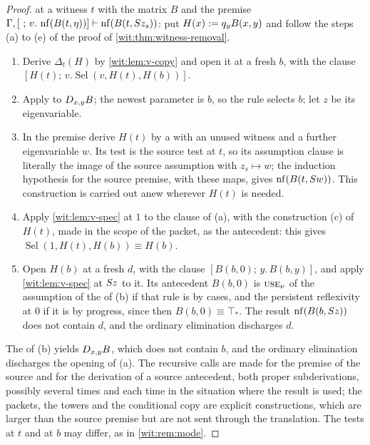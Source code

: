 \begin{proof}
 at a witness $t$ with the matrix $B$ and the premise
$\Gamma,[\ ;\,v.\,\nf(B(t,\eta))]\proves\nf(B(t,\Suc z_s))$: put
$H(x)\mathrel{:=} q_yB(x,y)$ and follow the steps (a) to (e) of the proof of
\cref{wit:thm:witness-removal}.
\begin{enumerate}[label=\textup{(\alph*)}]
\item Derive $\Delta_t(H)$ by \cref{wit:lem:v-copy} and open it at a fresh
 $b$, with the clause $[H(t);\,v.\operatorname{Sel}(v,H(t),H(b))]$.
\item Apply  to $D_{x,y}B$; the newest parameter is $b$, so
 the rule selects $b$; let $z$ be its eigenvariable.
\item In the premise derive $H(t)$ by a  with an unused
 witness and a further eigenvariable $w$.  Its test is the source test at
 $t$, so its assumption clause is literally the image of the source
 assumption with $z_s\mapsto w$; the induction hypothesis for the source
 premise, with these maps, gives $\operatorname{nf}(B(t,S w))$.  This construction is
 carried out anew wherever $H(t)$ is needed.
\item Apply \cref{wit:lem:v-spec} at $1$ to the clause of (a), with the
 construction (c) of $H(t)$, made in the scope of the packet, as the
 antecedent: this gives $\operatorname{Sel}(1,H(t),H(b))\equiv H(b)$.
\item Open $H(b)$ at a fresh $d$, with the clause $[B(b,0);\,y.\,B(b,y)]$,
 and apply \cref{wit:lem:v-spec} at $S z$ to it.  Its antecedent
 $B(b,0)$ is $\rulename{Use}_\nu$ of the assumption of the 
 of (b) if that rule is by cases, and the persistent reflexivity at $0$ if it
 is by progress, since then $B(b,0)\equiv\top_{*}$.  The result
 $\operatorname{nf}(B(b,S z))$ does not contain $d$, and the ordinary elimination
 discharges $d$.
\end{enumerate}
The  of (b) yields $D_{x,y}B$, which does not contain $b$,
and the ordinary elimination discharges the opening of (a).  The recursive
calls are made for the premise of the source  and for the
derivation of a source antecedent, both proper subderivations, possibly
several times and each time in the situation where the result is used; the
packets, the towers and the conditional copy are explicit constructions,
which are larger than the source premise but are not sent through the
translation.  The tests at $t$ and at $b$ may differ, as in
\cref{wit:rem:mode}.
\end{proof}

